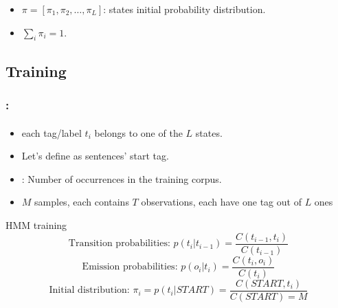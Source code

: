 \documentclass[xcolor=table]{beamer}
\begin{document}
\begin{frame}
\begin{minipage}{.45\textwidth}
	\end{minipage}
	
	\begin{itemize}
		\item $\pi = [\pi_1, \pi_2, \ldots, \pi_L ]$: states initial probability distribution.
		\item $\sum_i \pi_i = 1$.
	\end{itemize}
	
\end{frame}

\subsection{Training}

\begin{frame}
	\frametitle{\insertshortsubtitle: \insertsection}
	\framesubtitle{\insertsubsection}
	
	\begin{itemize}
		\item each tag/label $t_i$ belongs to one of the $ L $ states.
		\item Let's define  as sentences' start tag.
		\item {}: Number of occurrences in the training corpus.
		\item $ M $  samples, each contains $ T $ observations, each have one tag out of $ L $ ones
	\end{itemize}
	
	\begin{block}{HMM training}
		\[
		\text{Transition probabilities: } p(t_i | t_{i-1}) = \frac{C(t_{i-1}, t_i)}{C(t_{i-1})} 
		\]\[
		\text{Emission probabilities: } p(o_i | t_i) = \frac{C(t_i, o_i)}{C(t_i)}
		\]\[
		\text{Initial distribution: } \pi_i = p(t_i | START) = \frac{C(START, t_i)}{C(START)=M}
		\]
	\end{block}
	
\end{frame}
\end{document}
